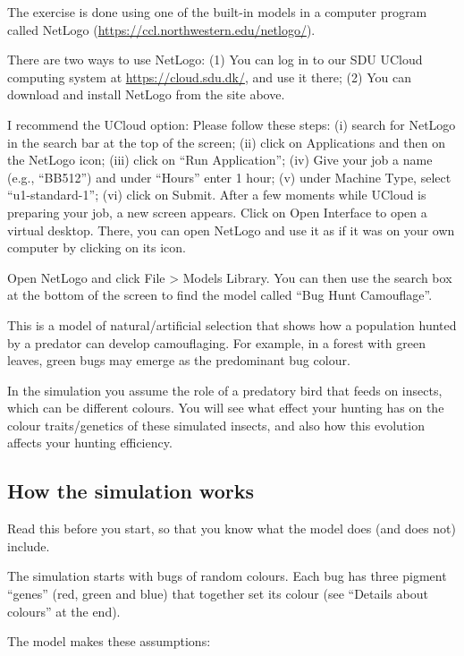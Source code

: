 \documentclass[
  a4paper]{book}
\begin{document}
The exercise is done using one of the built-in models in a computer program called NetLogo (\url{https://ccl.northwestern.edu/netlogo/}).

There are two ways to use NetLogo: (1) You can log in to our SDU UCloud computing system at \url{https://cloud.sdu.dk/}, and use it there; (2) You can download and install NetLogo from the site above.

I recommend the UCloud option: Please follow these steps: (i) search for NetLogo in the search bar at the top of the screen; (ii) click on Applications and then on the NetLogo icon; (iii) click on ``Run Application''; (iv) Give your job a name (e.g., ``BB512'') and under ``Hours'' enter 1 hour; (v) under Machine Type, select ``u1-standard-1''; (vi) click on Submit. After a few moments while UCloud is preparing your job, a new screen appears. Click on Open Interface to open a virtual desktop. There, you can open NetLogo and use it as if it was on your own computer by clicking on its icon.

Open NetLogo and click File \textgreater{} Models Library. You can then use the search box at the bottom of the screen to find the model called ``Bug Hunt Camouflage''.

This is a model of natural/artificial selection that shows how a population hunted by a predator can develop camouflaging. For example, in a forest with green leaves, green bugs may emerge as the predominant bug colour.

In the simulation you assume the role of a predatory bird that feeds on insects, which can be different colours. You will see what effect your hunting has on the colour traits/genetics of these simulated insects, and also how this evolution affects your hunting efficiency.

\subsection{How the simulation works}\label{how-the-simulation-works-1}

Read this before you start, so that you know what the model does (and does not) include.

The simulation starts with bugs of random colours. Each bug has three pigment ``genes'' (red, green and blue) that together set its colour (see ``Details about colours'' at the end).

The model makes these assumptions:
\end{document}
